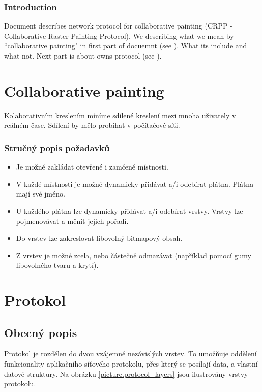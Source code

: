 \documentclass[12pt,oneside,a4paper]{report}
\begin{document}
\section{Introduction}

Document describes network protocol for collaborative painting (CRPP - Collaborative Raster Painting Protocol). We describing what we mean by ``collaborative painting" in first part of docuemnt (see \ref{part.colaborative-painting}). What its include and what not. Next part is about owns protocol (see \ref{part.protocol}).

\part{Collaborative painting}
\label{part.colaborative-painting}

Kolaborativním kreslením míníme sdílené kreslení mezi mnoha uživately v reálném čase. Sdílení by mělo probíhat v počítačové síťi.

\section{Stručný popis požadavků}

\begin{itemize}
	\item Je možné zakládat otevřené i zamčené místnosti.
	\item V každé místnosti je možné dynamicky přidávat a/i odebírat plátna. Plátna mají své jméno.
	\item U každého plátna lze dynamicky přidávat a/i odebírat vrstvy. Vrstvy lze pojmenovávat a měnit jejich pořadí.
	\item Do vrstev lze zakreslovat libovolný bitmapový obsah.
	\item Z vrstev je možné zcela, nebo částečně odmazávat (například pomocí gumy libovolného tvaru a krytí).
\end{itemize}


\part{Protokol}
\label{part.protocol}


\chapter{Obecný popis}

Protokol je rozdělen do dvou vzájemně nezávislých vrstev. To umožňuje oddělení funkcionality aplikačního síťového protokolu, přes který se posílají data, a vlastní datové struktury. Na obrázku \ref{picture.protocol_layers} jsou ilustrovány vrstvy protokolu.
\end{document}
